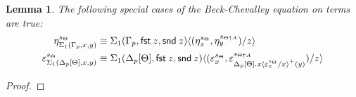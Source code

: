 \documentclass[10pt]{article}
\newtheorem{lemma}{Lemma}
\theoremstyle{definition}
\newcommand\dsd[1]{\ensuremath{\mathsf{#1}}}
\newcommand\TrPlus[2]{\ensuremath{{#1}^+(#2)}}
\newcommand\TrCirc[2]{\ensuremath{{#1}^\circ(#2)}}
\newcommand{\id}{\mathsf{id}}
\newcommand\ap[2]{\ensuremath{#1 \langle #2 \rangle }}
\newcommand\ApPlus[2]{\ensuremath{{#1}^+ \langle #2 \rangle }}
\newcommand\ApCirc[2]{\ensuremath{{#1}^\circ \langle #2 \rangle }}
\newcommand{\app}[2]{\ensuremath{#1 \: #2}}
\newcommand{\fst}[1]{\app{\dsd{fst}}{#1}}
\newcommand{\snd}[1]{\app{\dsd{snd}}{#1}}
\newcommand\bdot[0]{\mathbin{.}}
\begin{document}
\begin{lemma}
The following special cases of the Beck-Chevalley equation on terms are true:
\begin{align*}
\eta^{s_{\Theta}}_{\Sigma_1(\asdep{\Gamma},x,y)} &\equiv \ap{\Sigma_1(\asdep{\Gamma},\fst z, \snd z)}{(\eta^{s_\Theta}_x, \eta^{s_{\Theta \uparrow A}}_y)/z} \\
\varepsilon^{s_{\Theta}}_{\Sigma_1(\asdep{\Delta}[\Theta],x,y)} &\equiv \ap{\Sigma_1(\asdep{\Delta}[\Theta], \fst z, \snd z)}{(\varepsilon^{s_\Theta}_{x}, \varepsilon^{s_{\Theta \uparrow A}}_{\TrPlus{\ap{\asdep{\Delta}[\Theta].x}{\varepsilon^{s_\Theta}_{x}/x}}{y}})/z}
\end{align*}
\end{lemma}
\begin{proof}
\end{proof}
\end{document}
